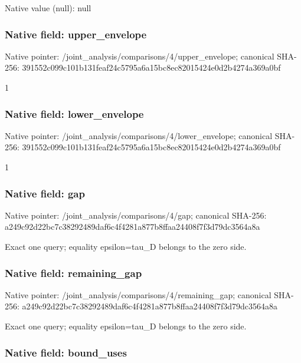 \documentclass[10pt,a4paper]{article}
\begin{document}
Native value (null): null



\subsubsection{Native field: upper\_envelope}


Native pointer: /joint\_analysis/comparis\allowbreak{}ons/4/upper\_envelope; canonical SHA-256: 391552c099c101b131feaf24\allowbreak{}c5795a6a15bc8ec82015424e\allowbreak{}0d2b4274a369a0bf


1


\subsubsection{Native field: lower\_envelope}


Native pointer: /joint\_analysis/comparis\allowbreak{}ons/4/lower\_envelope; canonical SHA-256: 391552c099c101b131feaf24\allowbreak{}c5795a6a15bc8ec82015424e\allowbreak{}0d2b4274a369a0bf


1


\subsubsection{Native field: gap}


Native pointer: /joint\_analysis/comparisons/4/gap; canonical SHA-256: a249c92d22bc7c38292489da\allowbreak{}f6c4f4281a877b8ffaa24408\allowbreak{}f7f3d79dc3564a8a


Exact one query; equality epsilon=tau\_D belongs to the zero side.


\subsubsection{Native field: remaining\_gap}


Native pointer: /joint\_analysis/comparis\allowbreak{}ons/4/remaining\_gap; canonical SHA-256: a249c92d22bc7c38292489da\allowbreak{}f6c4f4281a877b8ffaa24408\allowbreak{}f7f3d79dc3564a8a


Exact one query; equality epsilon=tau\_D belongs to the zero side.


\subsubsection{Native field: bound\_uses}
\end{document}
